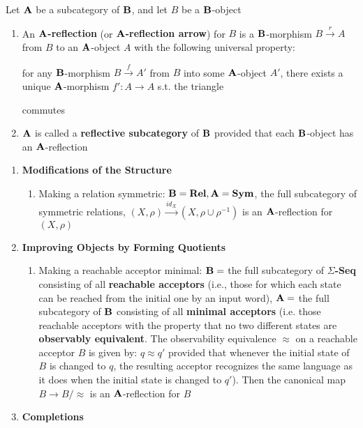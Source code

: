 \documentclass[11pt]{article}
\DeclareMathOperator{\Rel}{\textbf{Rel}}
\DeclareMathOperator{\Sym}{\textbf{Sym}}
\begin{document}
\begin{definition}[]
Let \(\operatorname{\textbf{A}}\) be a subcategory of \(\operatorname{\textbf{B}}\), and let \(B\) be a \(\operatorname{\textbf{B}}\)-object
\begin{enumerate}
\item An \textbf{\(\operatorname{\textbf{A}}\)-reflection} (or \textbf{\(\operatorname{\textbf{A}}\)-reflection arrow}) for \(B\) is a
\(\operatorname{\textbf{B}}\)-morphism \(B\xrightarrow{r}A\) from \(B\) to an \(\operatorname{\textbf{A}}\)-object
\(A\) with the following universal property:

for any \(\operatorname{\textbf{B}}\)-morphism \(B\xrightarrow{f}A'\) from \(B\) into some
\(\operatorname{\textbf{A}}\)-object \(A'\), there exists a unique \(\operatorname{\textbf{A}}\)-morphism \(f':A\to
      A\) s.t. the triangle
\begin{center}\end{center}
commutes
\item \(\operatorname{\textbf{A}}\) is called a \textbf{reflective subcategory} of \(\operatorname{\textbf{B}}\) provided that each
\(\operatorname{\textbf{B}}\)-object has an \(\operatorname{\textbf{A}}\)-reflection
\end{enumerate}
\end{definition}

\begin{examplle}[]
\begin{enumerate}
\item \textbf{Modifications of the Structure}
\begin{enumerate}
\item Making a relation symmetric: \(\bB=\Rel,\bA=\Sym\), the full subcategory
of symmetric relations, \((X,\rho)\xrightarrow{id_X}(X,\rho\cup\rho^{-1})\)
is an \(\operatorname{\textbf{A}}\)-reflection for \((X,\rho)\)
\end{enumerate}
\item \textbf{Improving Objects by Forming Quotients}
\begin{enumerate}
\item Making a reachable acceptor minimal: \(\operatorname{\textbf{B}}=\) the full subcategory of
\textbf{\(\Sigma\)-Seq} consisting of all \textbf{reachable acceptors} (i.e., those for
which each state can be reached from the initial one by an input word),
\(\operatorname{\textbf{A}}=\) the full subcategory of \(\operatorname{\textbf{B}}\) consisting of all \textbf{minimal
acceptors} (i.e. those reachable acceptors with the property that no two
different states are \textbf{observably equivalent}. The observability
equivalence \(\approx\) on a reachable acceptor \(B\) is given by:
\(q\approx q'\) provided that whenever the initial state of \(B\) is
changed to \(q\), the resulting acceptor recognizes the same language
as it does when the initial state is changed to \(q'\)). Then the
canonical map \(B\to B/\approx\) is an \(\operatorname{\textbf{A}}\)-reflection for \(B\)
\end{enumerate}
\item \textbf{Completions}
\end{enumerate}
\end{examplle}
\end{document}
